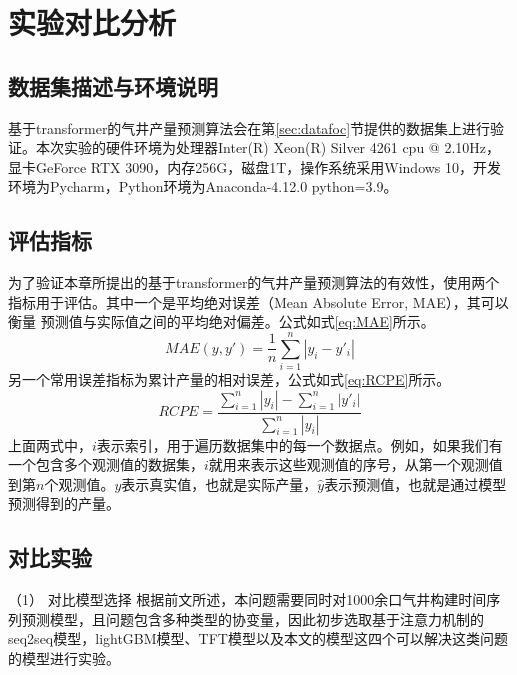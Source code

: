 \section{实验对比分析}
\subsection{数据集描述与环境说明}
基于transformer的气井产量预测算法会在第\ref{sec:datafoc}节提供的数据集上进行验证。本次实验的硬件环境为处理器Inter(R) Xeon(R) Silver 4261 cpu @ 2.10Hz，
显卡GeForce RTX 3090，内存256G，磁盘1T，操作系统采用Windows 10，开发环境为Pycharm，Python环境为Anaconda-4.12.0 python=3.9。
\subsection{评估指标}
为了验证本章所提出的基于transformer的气井产量预测算法的有效性，使用两个指标用于评估。其中一个是平均绝对误差（Mean Absolute Error, MAE），其可以衡量
预测值与实际值之间的平均绝对偏差。公式如式\eqref{eq:MAE}所示。
\begin{equation}
    MAE(y, y') = \frac{1}{n} \sum_{i=1}^{n} |y_i - y'_i|
    \label{eq:MAE}
\end{equation}
另一个常用误差指标为累计产量的相对误差，公式如式\eqref{eq:RCPE}所示。
\begin{equation}
    RCPE = \frac{\sum_{i=1}^{n} |y_i| - \sum_{i=1}^{n} |y'_i|}{\sum_{i=1}^{n} |y_i|}
    \label{eq:RCPE}
\end{equation}
上面两式中，$i$表示索引，用于遍历数据集中的每一个数据点。例如，如果我们有一个包含多个观测值的数据集，$i$就用来表示这些观测值的序号，从第一个观测值
到第$n$个观测值。$y$表示真实值，也就是实际产量，$\hat{y}$表示预测值，也就是通过模型预测得到的产量。
\subsection{对比实验}
（1） 对比模型选择
根据前文所述，本问题需要同时对1000余口气井构建时间序列预测模型，且问题包含多种类型的协变量，因此初步选取基于注意力机制的seq2seq模型，lightGBM模型、TFT模型以及本文的模型这四个可以解决这类问题的模型进行实验。


